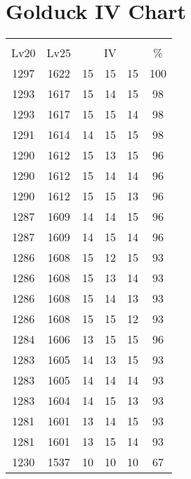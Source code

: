 \documentclass{article}%
\begin{document}
%
\normalsize%
\section{Golduck IV Chart}%
\label{sec:Golduck IV Chart}%
\renewcommand{\arraystretch}{1.5}%
\begin{tabular}{|c|c|c|c|c|c|}%
\hline%
\multicolumn{6}{|c|}{\textcolor{white}{ 
\linebreak{Golduck}
}%
\cellcolor{black}}\\%
\multicolumn{1}{|c}{Lv20}&\multicolumn{1}{c|}{Lv25}&\multicolumn{3}{c|}{IV}&\multicolumn{1}{|c|}{\%}\\%
\hline%
\rowcolor{color100}%
1297&1622&15&15&15&100\\%
\hline%
\rowcolor{color98}%
1293&1617&15&14&15&98\\%
\hline%
\rowcolor{color98}%
1293&1617&15&15&14&98\\%
\hline%
\rowcolor{color98}%
1291&1614&14&15&15&98\\%
\hline%
\rowcolor{color96}%
1290&1612&15&13&15&96\\%
\hline%
\rowcolor{color96}%
1290&1612&15&14&14&96\\%
\hline%
\rowcolor{color96}%
1290&1612&15&15&13&96\\%
\hline%
\rowcolor{color96}%
1287&1609&14&14&15&96\\%
\hline%
\rowcolor{color96}%
1287&1609&14&15&14&96\\%
\hline%
\rowcolor{color93}%
1286&1608&15&12&15&93\\%
\hline%
\rowcolor{color93}%
1286&1608&15&13&14&93\\%
\hline%
\rowcolor{color93}%
1286&1608&15&14&13&93\\%
\hline%
\rowcolor{color93}%
1286&1608&15&15&12&93\\%
\hline%
\rowcolor{color96}%
1284&1606&13&15&15&96\\%
\hline%
\rowcolor{color93}%
1283&1605&14&13&15&93\\%
\hline%
\rowcolor{color93}%
1283&1605&14&14&14&93\\%
\hline%
\rowcolor{color93}%
1283&1604&14&15&13&93\\%
\hline%
\rowcolor{color93}%
1281&1601&13&14&15&93\\%
\hline%
\rowcolor{color93}%
1281&1601&13&15&14&93\\%
\hline%
\rowcolor{color91}%
1230&1537&10&10&10&67\\%
\end{tabular}

%
\end{document}
